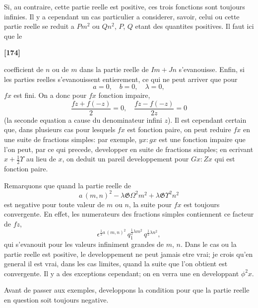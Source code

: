 \documentclass[11pt,a4paper]{article}
\begin{document}
Si, au contraire, cette partie reelle est positive, ces trois fonctions sont toujours infinies.
Il y a cependant un cas particulier a considerer, savoir, celui ou cette partie reelle
se reduit a $Pm^2$ ou $Qn^2$, $P$, $Q$ etant des quantites positives. Il faut ici que le

\textbf{[174]}

coefficient de $n$ ou de $m$ dans la partie reelle de $Im + Jn$ s'evanouisse. Enfin, si les
parties reelles s'evanouissent entierement, ce qui ne peut arriver que pour
\[a = 0,\quad b = 0,\quad \lambda = 0,\]
$fx$ est fini. On a donc pour $fx$ fonction impaire,
\[\frac{fz + f(-z)}{2} = 0,\quad \frac{fz - f(-z)}{2z} = 0\]
(la seconde equation a cause du denominateur infini $z$). Il est cependant certain que,
dans plusieurs cas pour lesquels $fx$ est fonction paire, on peut reduire $fx$ en une suite
de fractions simples: par exemple, $yx : gx$ est une fonction impaire que l'on peut, par
ce qui precede, developper en suite de fractions simples; en ecrivant $x + \frac{1}{2}\Upsilon$ au lieu
de $x$, on deduit un pareil developpement pour $Gx : Zx$ qui est fonction paire.

Remarquons que quand la partie reelle de
\[a\, (m, n)^2 - \lambda\mathfrak{G}\Omega^2 m^2 + \lambda\mathfrak{G}\Upsilon^2 n^2\]
est negative pour toute valeur de $m$ ou $n$, la suite pour $fx$ est toujours convergente.
En effet, les numerateurs des fractions simples contiennent ce facteur de $fz$,
\[\epsilon^{\frac{1}{2}a\, (m, n)^2}\, q_1^{\frac{1}{2}\lambda m^2}\, q^{\frac{1}{2}\lambda n^2},\]
qui s'evanouit pour les valeurs infiniment grandes de $m$, $n$. Dans le cas ou la partie
reelle est positive, le developpement ne peut jamais etre vrai; je crois qu'en general
il est vrai, dans les cas limites, quand la suite que l'on obtient est convergente. Il
y a des exceptions cependant; on en verra une en developpant $\phi^2 x$.

Avant de passer aux exemples, developpons la condition pour que la partie reelle
en question soit toujours negative.
\end{document}
